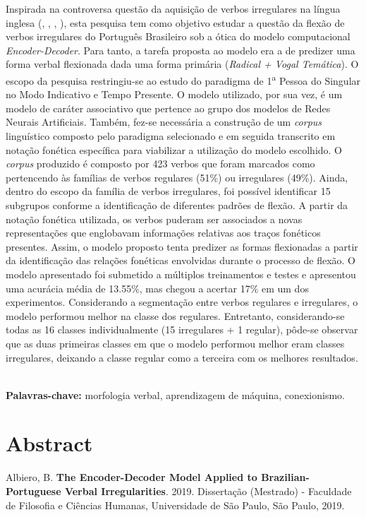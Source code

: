\documentclass[12pt,twoside,a4paper]{book}
\newcommand{\aup}{\textsuperscript}
\begin{document}
Inspirada na controversa questão da aquisição de verbos irregulares na língua inglesa (\cite{chomsky:1968},  \cite{Pinker:1988},
\cite{Albright2003RulesVA}, \cite{kirov:2018}), esta pesquisa tem como objetivo estudar a questão da flexão de verbos irregulares do Português Brasileiro sob a ótica do modelo computacional \textit{Encoder-Decoder}. Para tanto, a tarefa proposta ao modelo era a de predizer uma forma verbal flexionada dada uma forma primária (\textit{Radical + Vogal Temática}). O escopo da pesquisa restringiu-se ao estudo do paradigma de 1\aup{a} Pessoa do Singular no Modo Indicativo e Tempo Presente. O modelo utilizado, por sua vez, é um modelo de caráter associativo que pertence ao grupo dos modelos de Redes Neurais Artificiais. Também, fez-se necessária a construção de um \textit{corpus} linguístico composto pelo paradigma selecionado e em seguida transcrito em notação fonética específica para viabilizar a utilização do modelo escolhido. O \textit{corpus} produzido é composto por 423 verbos que foram marcados como pertencendo às famílias de verbos regulares (51\%) ou irregulares (49\%). Ainda, dentro do escopo da família de verbos irregulares, foi possível identificar 15 subgrupos conforme a identificação de diferentes padrões de flexão. A partir da notação fonética utilizada, os verbos puderam ser associados a novas representações que englobavam informações relativas aos traços fonéticos presentes. Assim, o modelo proposto tenta predizer as formas flexionadas a partir da identificação das relações fonéticas envolvidas durante o processo de flexão. O modelo apresentado foi submetido a múltiplos treinamentos e testes e apresentou uma acurácia média de 13.55\%, mas chegou a acertar 17\% em um dos experimentos. Considerando a segmentação entre verbos regulares e irregulares, o modelo performou melhor na classe dos regulares. Entretanto, considerando-se todas as 16 classes individualmente (15 irregulares + 1 regular), pôde-se observar que as duas primeiras classes em que o modelo performou melhor eram classes irregulares, deixando a classe regular como a terceira com os melhores resultados.

\\
 \textbf{Palavras-chave:}
morfologia verbal, aprendizagem de máquina, conexionismo.

\chapter*{Abstract}
\noindent Albiero, B. \textbf{The Encoder-Decoder Model Applied to Brazilian-Portuguese Verbal Irregularities}. 
2019.
Dissertação (Mestrado) - Faculdade de Filosofia e Ciências Humanas,
Universidade de São Paulo, São Paulo, 2019.
\\
\end{document}
